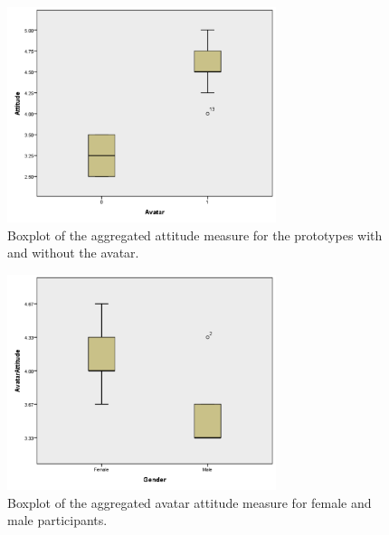 \documentclass[a4paper]{article}
\begin{document}
\begin{figure}[ht]
\begin{center}
\includegraphics[width=0.7\textwidth]{boxplot-avatar.png}
\caption{Boxplot of the aggregated attitude measure for the prototypes with and without the avatar.}
\label{fig:boxplot-avatar}
\end{center}
\end{figure}

\begin{figure}[ht]
\begin{center}
\includegraphics[width=0.7\textwidth]{boxplot-gender.png}
\caption{Boxplot of the aggregated avatar attitude measure for female and male participants.}
\label{fig:boxplot-gender}
\end{center}
\end{figure}
\end{document}

